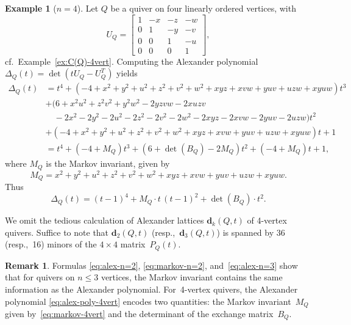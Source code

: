 \documentclass[11pt, letterpaper]{amsart}
\theoremstyle{definition}
\newtheorem{remark}[theorem]{Remark}
\newtheorem{example}[theorem]{Example}
\numberwithin{equation}{section}
\def\dd{{\mathbf{d}}}
\begin{document}
\begin{example}[$n=4$]
Let $Q$ be a quiver on four linearly ordered vertices, with %
\begin{equation*}
U_Q\!=\begin{bmatrix} 
1 & -x & -z & -w \\
0 & 1 & -y & -v\\
0 & 0 & 1 & -u \\
0 & 0 & 0 & 1
\end{bmatrix} ,  
\end{equation*}
cf.\ Example~\ref{ex:C(Q)-4vert}.
Computing the Alexander polynomial $\Delta_Q(t)=\det(tU_Q-U_Q^T)$ yields 
\begin{align*}
\Delta_Q(t) %
&=t^4 + (-4 + x^2+y^2+u^2+z^2+v^2+w^2+xyz+xvw+yuv+uzw +xyuw)t^3 \\
&+ (6  +x^2u^2 +z^2v^2 + y^2w^2 - 2yzvw - 2xuzv \\
& \quad  -2x^2 -2 y^2 -2 u^2 -2 z^2 -2v^2 -2w^2 -2 xyz-2xvw-2yuv-2uzw )t^2 \\
&+  (-4 + x^2+y^2+u^2+z^2+v^2+w^2+xyz+xvw+yuv+uzw +xyuw)t + 1\\
&=t^4 + (-4 +M_Q)t^3 + (6 +\det(B_Q)-2M_Q)t^2 
+  (-4 + M_Q)t + 1, 
\end{align*}
where $M_Q$ is the Markov invariant, given by  
\begin{equation}
\label{eq:markov-4vert}
M_Q=x^2+y^2+u^2+z^2+v^2+w^2+xyz+xvw+yuv+uzw +xyuw. 
\end{equation}
Thus
\begin{equation}
\label{eq:alex-poly-4vert}
\Delta_Q(t)=(t-1)^4+M_Q\cdot t\,(t-1)^2 +\det(B_Q)\cdot t^2. 
\end{equation}

We omit the tedious calculation of Alexander lattices $\dd_k(Q,t)$ of 4-vertex quivers.
Suffice to note that $\dd_2(Q,t)$ (resp.,~$\dd_3(Q,t)$) is spanned by 36 (resp.,~16) minors of the $4\times4$ matrix~$P_Q(t)$. 
\end{example}

\begin{remark}
Formulas \eqref{eq:alex-n=2}, \eqref{eq:markov-n=2}, and~\eqref{eq:alex-n=3} show that
for quivers on $n\le 3$ vertices, the Markov invariant contains the same information
as the Alexander polynomial. 
For~4-vertex quivers, the Alexander polynomial \eqref{eq:alex-poly-4vert} encodes two quantities:
the Markov invariant~$M_Q$ given by~\eqref{eq:markov-4vert} and the determinant of the exchange matrix~$B_Q$. 
\end{remark}
\end{document}
